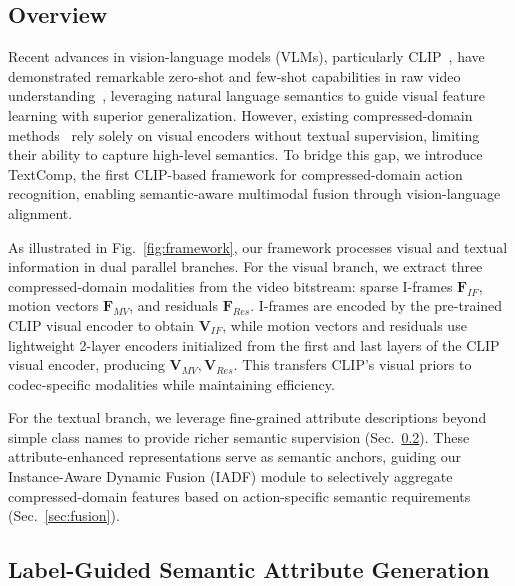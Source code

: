 \documentclass[letterpaper]{article} %
\begin{document}
\subsection{Overview}
\label{sec:baseline}

Recent advances in vision-language models (VLMs), particularly CLIP~\cite{radford2021learning}, have demonstrated remarkable zero-shot and few-shot capabilities in raw video understanding~\cite{wang2021actionclipnewparadigmvideo,ni2022expanding}, leveraging natural language semantics to guide visual feature learning with superior generalization. However, existing compressed-domain methods~\cite{li2023compressed,CFM-Net-li2025interactive} rely solely on visual encoders without textual supervision, limiting their ability to capture high-level semantics. To bridge this gap, we introduce TextComp, the first CLIP-based framework for compressed-domain action recognition, enabling semantic-aware multimodal fusion through vision-language alignment.

As illustrated in Fig.~\ref{fig:framework}, our framework processes visual and textual information in dual parallel branches. For the visual branch, we extract three compressed-domain modalities from the video bitstream: sparse I-frames $\mathbf{F}_{IF}$, motion vectors $\mathbf{F}_{MV}$, and residuals $\mathbf{F}_{Res}$. I-frames are encoded by the pre-trained CLIP visual encoder to obtain $\mathbf{V}_{IF}$, while motion vectors and residuals use lightweight 2-layer encoders initialized from the first and last layers of the CLIP visual encoder, producing $\mathbf{V}_{MV}, \mathbf{V}_{Res}$. This transfers CLIP's visual priors to codec-specific modalities while maintaining efficiency.

For the textual branch, we leverage fine-grained attribute descriptions beyond simple class names to provide richer semantic supervision (Sec.~\ref{sec:attribute}). These attribute-enhanced representations serve as semantic anchors, guiding our Instance-Aware Dynamic Fusion (IADF) module to selectively aggregate compressed-domain features based on action-specific semantic requirements (Sec.~\ref{sec:fusion}).

\subsection{Label-Guided Semantic Attribute Generation}
\label{sec:attribute}
\end{document}
